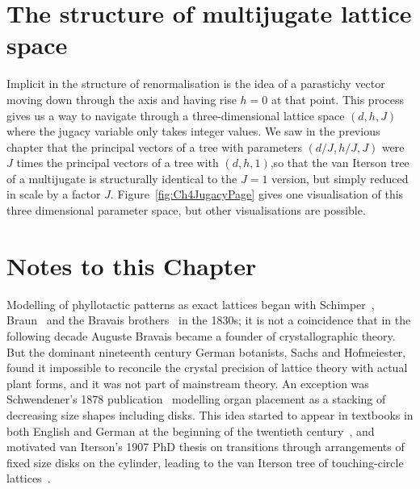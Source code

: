 \section{The structure of multijugate lattice space}
\label{sec:Jlattice}
Implicit in the structure of renormalisation is the idea of a parastichy vector moving down through the axis and having rise $h=0$ at that point. This process gives us a way to navigate through a three-dimensional lattice space $(d,h,J)$ where the jugacy variable only takes integer values. We saw in the previous chapter that the principal vectors of a tree with parameters $(d/J,h/J,J)$ were $J$ times the principal vectors of a tree with $(d,h,1)$,so that the van Iterson tree of a multijugate is structurally identical to the $J=1$ version, but simply reduced in scale by a factor $J$.  Figure~\ref{fig:Ch4JugacyPage} gives one visualisation of this three dimensional parameter space, but other visualisations are possible. 
\clearpage
\section{Notes to this Chapter}%

Modelling of phyllotactic patterns as exact lattices began with Schimper~\cite{schimperBeschreibungSymphytumZeyheri1835}, Braun~\cite{braunBetrachtungenUeberErscheinung1851} and the Bravais brothers~\cite{bravaisEssaiDispositionFeuilles1837} in the 1830s; it is not a coincidence that in the following decade Auguste Bravais became a founder of crystallographic theory. But the dominant nineteenth century German botanists, Sachs and Hofmeiester, found it impossible to reconcile the crystal precision of lattice theory with actual plant forms, and it was not part of mainstream theory. An exception was Schwendener's 1878 publication~\cite{schwendenerMechanischeTheorieBlattstellungen1878} modelling organ placement as a stacking of decreasing size shapes including disks.
This idea started to appear in textbooks in both English and German at the beginning of the twentieth century~\cite{weisseSketchMechanicalHypothesis1900}, and motivated van Iterson's 1907 PhD thesis on transitions through arrangements of fixed size disks on the cylinder, leading to the van Iterson tree of touching-circle lattices~\cite{vanitersonjrMathematischeUndMikroscopischAnatomische1907}. 

